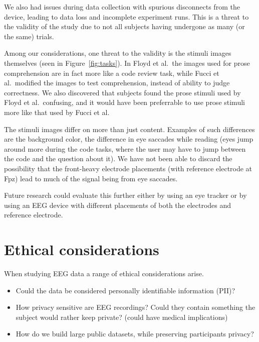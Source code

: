     We also had issues during data collection with spurious disconnects from the device, leading to data loss and incomplete experiment runs. This is a threat to the validity of the study due to not all subjects having undergone as many (or the same) trials.

    Among our considerations, one threat to the validity is the stimuli images themselves (seen in Figure~\ref{fig:tasks}). In Floyd et al.~the images used for prose comprehension are in fact more like a code review task, while Fucci et al.~modified the images to test comprehension, instead of ability to judge correctness. We also discovered that subjects found the prose stimuli used by Floyd et al.~confusing, and it would have been preferrable to use prose stimuli more like that used by Fucci et al.

    The stimuli images differ on more than just content. Examples of such differences are the background color, the difference in eye saccades while reading (eyes jump around more during the code tasks, where the user may have to jump between the code and the question about it). We have not been able to discard the possibility that the front-heavy electrode placements (with reference electrode at Fpz) lead to much of the signal being from eye saccades. 

    Future research could evaluate this further either by using an eye tracker or by using an EEG device with different placements of both the electrodes and reference electrode.


\section{Ethical considerations}

    When studying EEG data a range of ethical considerations arise. 

    \begin{itemize}
        \item Could the data be considered personally identifiable information (PII)? 
        \item How privacy sensitive are EEG recordings? Could they contain something the subject would rather keep private? (could have medical implications)
        \item How do we build large public datasets, while preserving participants privacy?
    \end{itemize}

